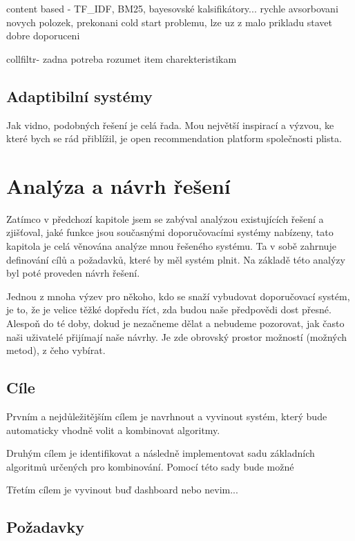 \documentclass[thesis=M,czech]{FITthesis}[2014/05/07]
\begin{document}
content based - TF\_IDF, BM25, bayesovské kalsifikátory... rychle avsorbovani novych polozek, prekonani cold start problemu, lze uz z malo prikladu stavet dobre doporuceni

collfiltr- zadna potreba rozumet item charekteristikam

\section{Adaptibilní systémy}

Jak vidno, podobných řešení je celá řada. Mou největší inspirací a výzvou, ke které bych se rád přiblížil, je open recommendation platform společnosti plista.

\chapter{Analýza a návrh řešení}
\label{chap:analysis}

Zatímco v předchozí kapitole jsem se zabýval analýzou existujících řešení a zjišťoval, jaké funkce jsou současnými doporučovacími systémy nabízeny, tato kapitola je celá věnována analýze mnou řešeného systému. Ta v sobě zahrnuje definování cílů a požadavků, které by měl systém plnit. Na základě této analýzy byl poté proveden návrh řešení. 

Jednou z mnoha výzev pro někoho, kdo se snaží vybudovat doporučovací systém, je to, že je velice těžké dopředu říct, zda budou naše předpovědi dost přesné. Alespoň do té doby, dokud je nezačneme dělat a nebudeme pozorovat, jak často naši uživatelé přijímají naše návrhy. Je zde obrovský prostor možností (možných metod), z čeho vybírat. 

\section{Cíle}

Prvním a nejdůležitějším cílem je navrhnout a vyvinout systém, který bude automaticky vhodně volit a kombinovat algoritmy.

Druhým cílem je identifikovat a následně implementovat sadu základních algoritmů určených pro kombinování. Pomocí této sady bude možné 

Třetím cílem je vyvinout buď dashboard nebo nevim...

\section{Požadavky}
\end{document}
